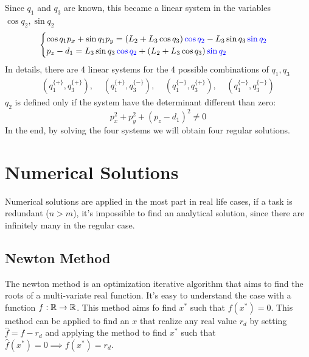 \documentclass[10pt, letterpaper]{report}
\begin{document}
Since $q_1$ and $q_3$ are known, this became a linear system in the variables $\cos q_2, \sin q_2$
\begin{equation}
   \begin{cases}
       \cos q_1 p_x+\sin q_1 p_y = (L_2+L_3\cos q_3)\color{blue}\cos q_2\color{black}-L_3\sin q_3\color{blue}\sin q_2\color{black}\\ 
        p_z-d_1=L_3\sin q_3\color{blue}\cos q_2\color{black}+(L_2+L_3\cos q_3)\color{blue}\sin q_2\color{black}
    \end{cases}
\end{equation}
In details, there are 4 linear systems for the 4 possible combinations of $q_1,q_3$\begin{align}
    (q_1^{\{+\}},q_3^{\{+\}}), \ \ \ \ \ 
    (q_1^{\{+\}},q_3^{\{-\}}), \ \ \ \ \ 
    (q_1^{\{-\}},q_3^{\{+\}}), \ \ \ \ \ 
    (q_1^{\{-\}},q_3^{\{-\}})
\end{align}
$q_2$ is defined only if the system have the determinant different than zero:\begin{equation}
    p_x^2+p_y^2+(p_z-d_1)^2\ne 0
\end{equation}
In the end, by solving the four systems we will obtain four regular solutions.

\section{Numerical Solutions}
Numerical solutions are applied in the most part in real life cases, if a task is redundant ($n>m$), it's impossible to find an analytical solution, since there are infinitely many in the regular case.
\subsection{Newton Method}
The newton method is an optimization iterative algorithm that aims to find the roots of a multi-variate real function. It's easy to understand the case with a function $f:{\mathbb R}\rightarrow {\mathbb R}$. This method aims fo find $x^*$ such that $f(x^*)=0$. This method can be applied to find an $x$ that realize any real value $r_d$ by setting $\hat f = f-r_d$ and applying the method to find $x^*$ such that $\hat f(x^*)=0\implies f(x^*)=r_d$.\bigskip 
\end{document}
